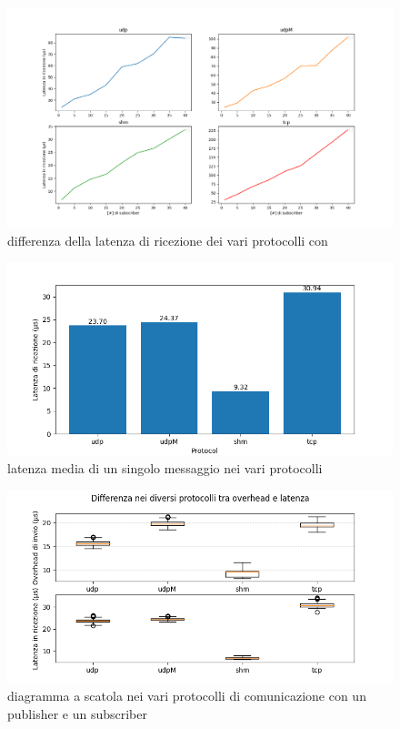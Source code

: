 \begin{figure}[H]
    \includegraphics[width=\textwidth]{./results/test3_different_protocol_send_receive.png} 
        \caption{differenza della latenza di ricezione dei vari protocolli con }\label{fig:test3_different_protocols}
\end{figure}

\begin{figure}[H]
    \includegraphics[width=\textwidth]{./results/test3_bar_sr_1p1s.png} 
        \caption{latenza media di un singolo messaggio nei vari protocolli}\label{fig:test3_different_protocols}%
\end{figure}

\begin{figure}[H] %
    \includegraphics[width=\textwidth]{./results/test1_box_sr_1p1s.png} 
        \caption{diagramma a scatola nei vari protocolli di comunicazione con un publisher e un subscriber}\label{fig:test1sdbox}
\end{figure}

